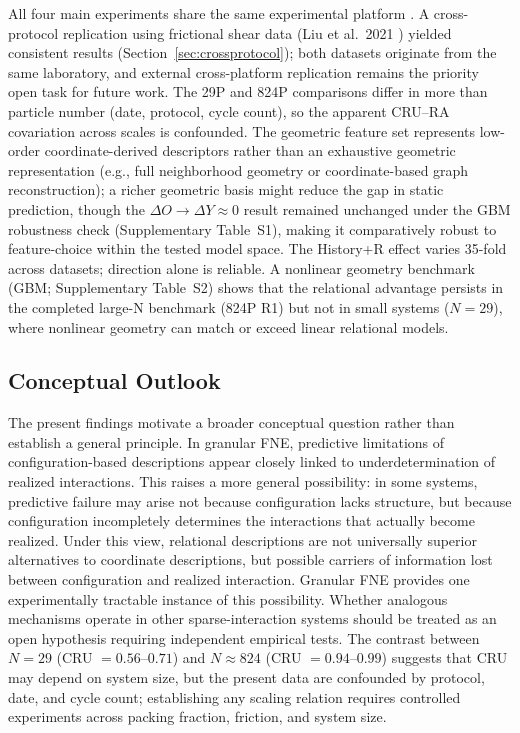 \documentclass[11pt,a4paper]{article}
\begin{document}
All four main experiments share the same experimental platform \cite{kollmer2019}.
A cross-protocol replication using frictional shear data (Liu et al.\ 2021 \cite{liu2021}) yielded consistent results (Section~\ref{sec:crossprotocol}); both datasets originate from the same laboratory, and external cross-platform replication remains the priority open task for future work.
The 29P and 824P comparisons differ in more than particle number (date, protocol, cycle count), so the apparent CRU--RA covariation across scales is confounded.
The geometric feature set represents low-order coordinate-derived descriptors rather than an exhaustive geometric representation (e.g., full neighborhood geometry or coordinate-based graph reconstruction); a richer geometric basis might reduce the gap in static prediction, though the $\Delta O\!\rightarrow\!\Delta Y \approx 0$ result remained unchanged under the GBM robustness check (Supplementary Table~S1), making it comparatively robust to feature-choice within the tested model space.
The History+R effect varies 35-fold across datasets; direction alone is reliable.
A nonlinear geometry benchmark (GBM; Supplementary Table~S2) shows that the relational advantage persists in the completed large-N benchmark (824P R1) but not in small systems ($N=29$), where nonlinear geometry can match or exceed linear relational models.

\subsection{Conceptual Outlook}

The present findings motivate a broader conceptual question rather than establish a general principle.
In granular FNE, predictive limitations of configuration-based descriptions appear closely linked to underdetermination of realized interactions.
This raises a more general possibility: in some systems, predictive failure may arise not because configuration lacks structure, but because configuration incompletely determines the interactions that actually become realized.
Under this view, relational descriptions are not universally superior alternatives to coordinate descriptions, but possible carriers of information lost between configuration and realized interaction.
Granular FNE provides one experimentally tractable instance of this possibility.
Whether analogous mechanisms operate in other sparse-interaction systems should be treated as an open hypothesis requiring independent empirical tests. The contrast between $N=29$ (CRU $= 0.56$--$0.71$) and $N\approx 824$ (CRU $= 0.94$--$0.99$) suggests that CRU may depend on system size, but the present data are confounded by protocol, date, and cycle count; establishing any scaling relation requires controlled experiments across packing fraction, friction, and system size.
\end{document}
